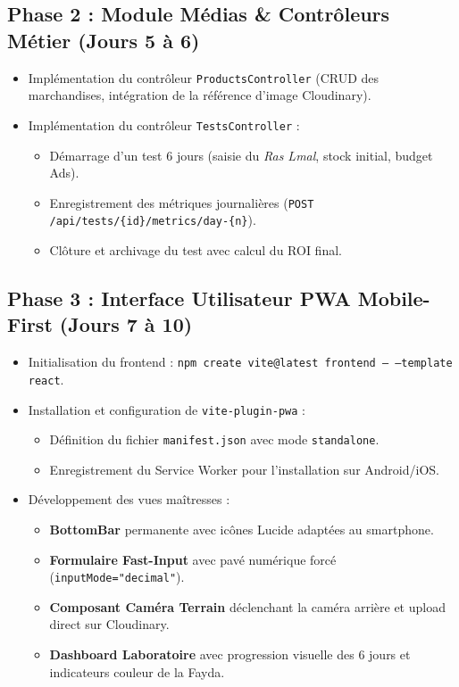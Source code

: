 \documentclass[11pt,a4paper]{article}
\begin{document}
\subsection{Phase 2 : Module Médias \& Contrôleurs Métier (Jours 5 à 6)}
\begin{itemize}[leftmargin=*]
    \item Implémentation du contrôleur \texttt{ProductsController} (CRUD des marchandises, intégration de la référence d'image Cloudinary).
    \item Implémentation du contrôleur \texttt{TestsController} :
    \begin{itemize}
        \item Démarrage d'un test 6 jours (saisie du \textit{Ras Lmal}, stock initial, budget Ads).
        \item Enregistrement des métriques journalières (\texttt{POST /api/tests/\{id\}/metrics/day-\{n\}}).
        \item Clôture et archivage du test avec calcul du ROI final.
    \end{itemize}
\end{itemize}

\subsection{Phase 3 : Interface Utilisateur PWA Mobile-First (Jours 7 à 10)}
\begin{itemize}[leftmargin=*]
    \item Initialisation du frontend : \texttt{npm create vite@latest frontend -- --template react}.
    \item Installation et configuration de \texttt{vite-plugin-pwa} :
    \begin{itemize}
        \item Définition du fichier \texttt{manifest.json} avec mode \texttt{standalone}.
        \item Enregistrement du Service Worker pour l'installation sur Android/iOS.
    \end{itemize}
    \item Développement des vues maîtresses :
    \begin{itemize}
        \item \textbf{BottomBar} permanente avec icônes Lucide adaptées au smartphone.
        \item \textbf{Formulaire Fast-Input} avec pavé numérique forcé (\texttt{inputMode="decimal"}).
        \item \textbf{Composant Caméra Terrain} déclenchant la caméra arrière et upload direct sur Cloudinary.
        \item \textbf{Dashboard Laboratoire} avec progression visuelle des 6 jours et indicateurs couleur de la Fayda.
    \end{itemize}
\end{itemize}
\end{document}
